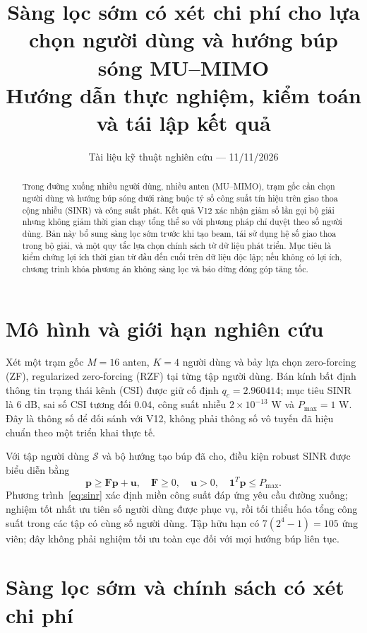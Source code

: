 \documentclass[11pt,onecolumn]{IEEEtran}
\title{Sàng lọc sớm có xét chi phí cho lựa chọn người dùng và hướng búp sóng MU--MIMO\\Hướng dẫn thực nghiệm, kiểm toán và tái lập kết quả}
\author{Tài liệu kỹ thuật nghiên cứu --- 11/11/2026}
\date{}
\begin{document}
\maketitle
\begin{abstract}
Trong đường xuống nhiều người dùng, nhiều anten (MU--MIMO), trạm gốc cần chọn người dùng và hướng búp sóng dưới ràng buộc tỷ số công suất tín hiệu trên giao thoa cộng nhiễu (SINR) và công suất phát. Kết quả V12 xác nhận giảm số lần gọi bộ giải nhưng không giảm thời gian chạy tổng thể so với phương pháp chỉ duyệt theo số người dùng. Bản này bổ sung sàng lọc sớm trước khi tạo beam, tái sử dụng hệ số giao thoa trong bộ giải, và một quy tắc lựa chọn chính sách từ dữ liệu phát triển. Mục tiêu là kiểm chứng lợi ích thời gian từ đầu đến cuối trên dữ liệu độc lập; nếu không có lợi ích, chương trình khóa phương án không sàng lọc và báo dừng đóng góp tăng tốc.
\end{abstract}

\section{Mô hình và giới hạn nghiên cứu}
Xét một trạm gốc $M=16$ anten, $K=4$ người dùng và bảy lựa chọn zero-forcing (ZF), regularized zero-forcing (RZF) tại từng tập người dùng. Bán kính bất định thông tin trạng thái kênh (CSI) được giữ cố định $q_c=2.960414$; mục tiêu SINR là $6$ dB, sai số CSI tương đối $0.04$, công suất nhiễu $2\times10^{-13}$ W và $P_{\max}=1$ W. Đây là thông số để đối sánh với V12, không phải thông số vô tuyến đã hiệu chuẩn theo một triển khai thực tế.

Với tập người dùng $\mathcal S$ và bộ hướng tạo búp đã cho, điều kiện robust SINR được biểu diễn bằng
\begin{equation}
\mathbf p\geq\mathbf F\mathbf p+\mathbf u,\quad
\mathbf F\geq0,\quad \mathbf u>0,\quad
\mathbf1^T\mathbf p\leq P_{\max}.
\label{eq:sinr}
\end{equation}
Phương trình~\eqref{eq:sinr} xác định miền công suất đáp ứng yêu cầu đường xuống; nghiệm tốt nhất ưu tiên số người dùng được phục vụ, rồi tối thiểu hóa tổng công suất trong các tập có cùng số người dùng. Tập hữu hạn có $7(2^4-1)=105$ ứng viên; đây không phải nghiệm tối ưu toàn cục đối với mọi hướng búp liên tục.

\section{Sàng lọc sớm và chính sách có xét chi phí}
\end{document}
